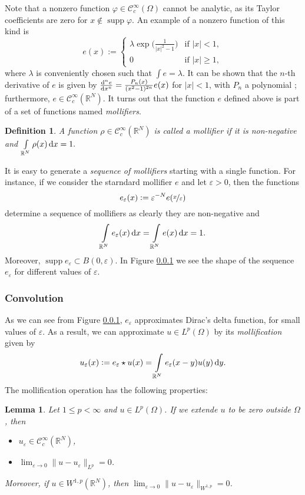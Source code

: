 \documentclass[a4paper,doc,11pt]{article}
\newtheorem{lemma}[theorem]{Lemma}
\newtheorem{definition}[theorem]{Definition}
\newcommand{\R}{\mathbb{R}}
\newcommand{\CC}{\mathcal{C}}
\DeclareMathOperator{\supp}{supp}
\begin{document}
Note that a nonzero function \(\varphi \in \CC_c^\infty (\Omega)\) cannot be analytic, as its Taylor coefficients are zero for \( x \notin \supp \varphi\). An example of a nonzero function of this kind is 
\[
    e(x) := 
    \begin{cases}
        \lambda \exp \Big( \frac{1}{|x|^2-1} \Big) & \text{if } |x| < 1,
        \\
        0   & \text{if } |x| \geq 1,
    \end{cases}
\]
where \(\lambda\) is conveniently chosen such that \( \int e = \lambda \).
It can be shown that the \(n\)-th derivative of \(e\) is given by \( \od[n]{e}{x} = \frac{P_n(x)}{(x^2-1)^{2n}} e(x) \) for \( |x| < 1\), with \(P_n\) a polynomial \citep{Ball2019}; furthermore, \( e \in \CC_c^\infty (\R^N)\). 
It turns out that the function \(e\) defined above is part of a set of functions named \emph{mollifiers}. 

\begin{definition}
    A function \( \rho \in \CC_c^\infty(\R^N)\) is called a \emph{mollifier} if it is non-negative and 
    \(
        \int\limits_{\R^N} \rho(x) \dif x = 1.
    \)
\end{definition}

It is easy to generate a \emph{sequence of mollifiers} starting with a single function. For instance, if we consider the starndard mollifier \(e\) and let \(\varepsilon > 0\), then the functions
\[
    e_\varepsilon (x) := \varepsilon^{-N} e( \nicefrac x \varepsilon )
\]
determine a sequence of mollifiers as clearly they are non-negative and 
\[
    \int\limits_{\R^N} e_\varepsilon (x) \dif x = \int\limits_{\R^N} e(x) \dif x = 1.
\]
Moreover, \( \supp e_\varepsilon \subset B(0,\varepsilon) \). In Figure \ref{} we see the shape of the sequence \( e_\varepsilon\) for different values of \(\varepsilon\).
%

\subsubsection{Convolution}

As we can see from Figure \ref{}, \( e_\varepsilon\) approximates Dirac's delta function, for small values of \(\varepsilon\). As a result, we can approximate \(u \in L^p (\Omega)\) by its \emph{mollification} given by
\[
    u_\varepsilon(x) := e_\varepsilon \star  u (x) = \int\limits_{\R^N} e_\varepsilon(x-y) u(y) \dif y.
\]
The mollification operation has the following properties:
\begin{lemma}
    Let \( 1\leq p < \infty\) and \( u \in L^p(\Omega)\). If we extende \(u \) to be zero outside \(\Omega\), then
    \begin{itemize}
        \item \(u_\varepsilon \in \CC_c^\infty (\R^N)\),
        \item \( \lim_{\varepsilon \to 0} \|u - u_\varepsilon\|_{L^p} = 0 \).
    \end{itemize}
    Moreover, if \(u \in W^{1,p} (\R^N)\), then \( \lim_{\varepsilon \to 0} \|u - u_\varepsilon\|_{W^{1,p}} = 0 \).
\end{lemma}
\end{document}
